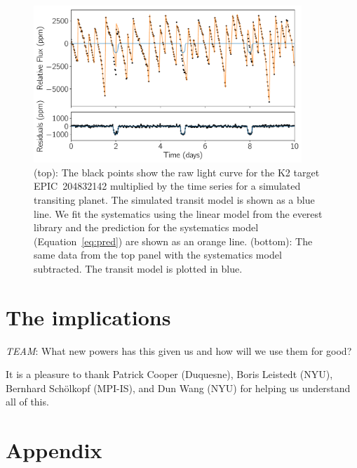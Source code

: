 \documentclass[modern]{rnaastex}
\newcommand{\project}[1]{\textsf{#1}}
\newcommand{\figurelabel}[1]{\label{fig:#1}}
\renewcommand{\eqref}[1]{\ref{eq:#1}}
\newcommand{\eqalt}[1]{Equation~\eqref{#1}}
\newcommand{\todo}[3]{{\color{#2}\emph{#1}: #3}}
\newcommand{\alltodo}[1]{\todo{TEAM}{red}{#1}}
\begin{document}
\begin{figure}[h!]
\begin{center}
\includegraphics[width=0.9\textwidth]{figure.pdf}
\caption{%
(top): The black points show the raw light curve for the \project{K2} target
    EPIC~204832142 multiplied by the time series for a simulated transiting
    planet.
    The simulated transit model is shown as a blue line.
    We fit the systematics using the linear model from the \project{everest}
    library \citep{Luger:2016, Luger:2017} and the prediction for the
    systematics model (\eqalt{pred}) are shown as an orange line.
(bottom): The same data from the top panel with the systematics model
    subtracted.
    The transit model is plotted in blue.
\figurelabel{figure}}
\end{center}
\end{figure}

\section{The implications}

\alltodo{What new powers has this given us and how will we use them for good?}

\acknowledgements
It is a pleasure to thank
  Patrick Cooper (Duquesne),
  Boris Leistedt (NYU),
  Bernhard Sch\"olkopf (MPI-IS), and
  Dun Wang (NYU)
for helping us understand all of this.



\section{Appendix}
\end{document}
